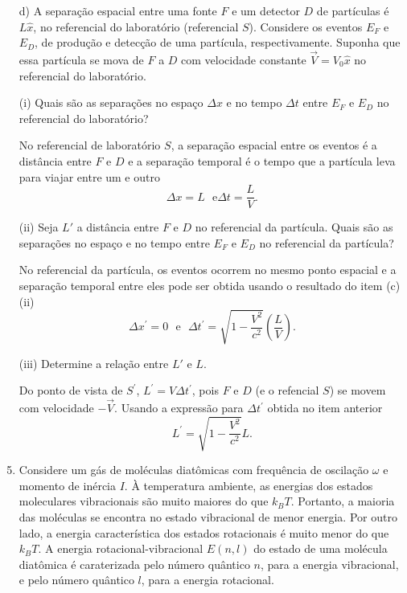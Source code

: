 \begin{enumerate}[start=1,label={\bfseries Q\arabic*.}]
d) A separação espacial entre uma fonte $F$ e um detector $D$ de partículas é $L \hat{x}$, no referencial do laboratório (referencial $S$). Considere os eventos $E_{F}$ e $E_{D}$, de produção e detecção de uma partícula, respectivamente. Suponha que essa partícula se mova de $F$ a $D$ com velocidade constante $\vec{V} = V_{0}\hat{x}$ no referencial do laboratório.

\item[(i)] Quais são as separações no espaço $\Delta x$ e no tempo $\Delta t$ entre $E_{F}$ e $E_{D}$ no referencial do laboratório?

\resposta No referencial de laboratório $S$, a separação espacial entre os eventos é a distância entre $F$ e $D$ e a separação temporal é o tempo que a partícula leva para viajar entre um e outro
%
\begin{equation}
  \Delta x = L \ \ \ \mbox{e} \Delta t = \frac{L}{V} .
\end{equation}
%

\item[(ii)] Seja $L'$ a distância entre $F$ e $D$ no referencial da partícula. Quais são as separações no espaço e no tempo entre $E_{F}$ e $E_{D}$ no referencial da partícula?

\resposta No referencial da partícula, os eventos ocorrem no mesmo ponto espacial e a separação temporal entre eles pode ser obtida usando o resultado do item (c)(ii)
%
\begin{equation}
  \Delta x^{\prime} = 0 \ \ \ \mbox{e} \ \ \ \Delta t^{\prime} = \sqrt{1 - \frac{V^{2}}{c^{2}}} \left( \frac{L}{V} \right) .
\end{equation}
%

\item[(iii)] Determine a relação entre $L'$ e $L$.

Do ponto de vista de $S^{\prime}$, $L^{\prime} = V \Delta t^{\prime}$, pois $F$ e $D$ (e o refencial $S$) se movem com velocidade $- \vec{V}$. Usando a expressão para $\Delta t^{\prime}$ obtida no item anterior
%
\begin{equation}
  L^{\prime} = \sqrt{1 - \frac{V^{2}}{c^{2}}} L .
\end{equation}







\item Considere um gás de moléculas diatômicas com frequência de oscilação $\omega$ e momento de inércia $I$. À temperatura ambiente, as energias dos estados moleculares vibracionais são muito maiores do que $k_{B}T$. Portanto, a maioria das moléculas se encontra no estado vibracional de menor energia. Por outro lado, a energia característica dos estados rotacionais é muito menor do que $k_{B}T$. A energia rotacional-vibracional $E(n,l)$ do estado de uma molécula diatômica é caraterizada pelo número quântico $n$, para a energia vibracional, e pelo número quântico $l$, para a energia rotacional.



\end{enumerate}
